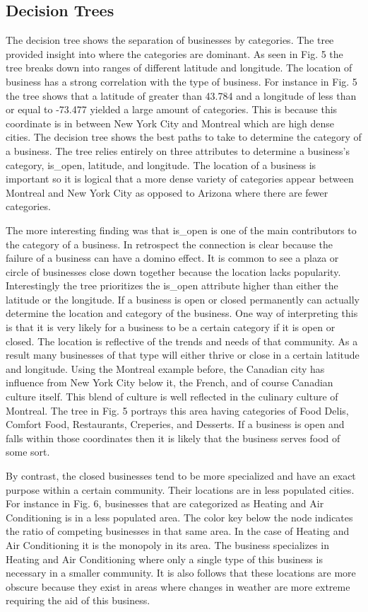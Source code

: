 \subsection{Decision Trees}

\quad The decision tree shows the separation of businesses by categories. The tree provided insight into where the categories are dominant. As seen in Fig. 5 the tree breaks down into ranges of different latitude and longitude. The location of business has a strong correlation with the type of business. For instance in Fig. 5 the tree shows that a latitude of greater than 43.784 and a longitude of less than or equal to -73.477 yielded a large amount of categories. This is because this coordinate is in between New York City and Montreal which are high dense cities. The decision tree shows the best paths to take to determine the category of a business. The tree relies entirely on three attributes to determine a business’s category, is_open, latitude, and longitude. The location of a business is important so it is logical that a more dense variety of categories appear between Montreal and New York City as opposed to Arizona where there are fewer categories.

\quad The more interesting finding was that is_open is one of the main contributors to the category of a business. In retrospect the connection is clear because the failure of a business can have a domino effect. It is common to see a plaza or circle of businesses close down together because the location lacks popularity. Interestingly the tree prioritizes the is_open attribute higher than either the latitude or the longitude. If a business is open or closed permanently can actually determine the location and category of the business. One way of interpreting this is that it is very likely for a business to be a certain category if it is open or closed. The location is reflective of the trends and needs of that community. As a result many businesses of that type will either thrive or close in a certain latitude and longitude. Using the Montreal example before, the Canadian city has influence from New York City below it, the French, and of course Canadian culture itself. This blend of culture is well reflected in the culinary culture of Montreal. The tree in Fig. 5 portrays this area having categories of Food Delis, Comfort Food, Restaurants, Creperies, and Desserts. If a business is open and falls within those coordinates then it is likely that the business serves food of some sort.

\quad By contrast, the closed businesses tend to be more specialized and have an exact purpose within a certain community. Their locations are in less populated cities. For instance in Fig. 6, businesses that are categorized as Heating and Air Conditioning is in a less populated area. The color key below the node indicates the ratio of competing businesses in that same area. In the case of Heating and Air Conditioning it is the monopoly in its area. The business specializes in Heating and Air Conditioning where only a single type of this business is necessary in a smaller community. It is also follows that these locations are more obscure because they exist in areas where changes in weather are more extreme requiring the aid of this business.

